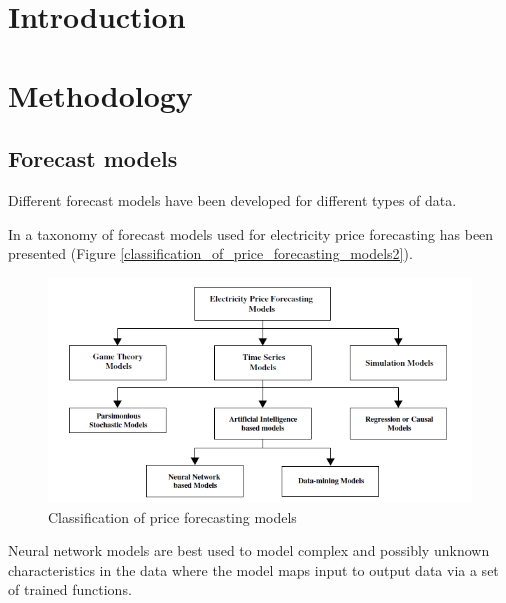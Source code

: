 
\section{Introduction}


\section{Methodology}


\subsection{Forecast models}

Different forecast models have been developed for different types of data. 

In \cite{aggarwal2009electricity} a taxonomy of forecast models used for electricity price forecasting has been presented (Figure \ref{classification_of_price_forecasting_models2}). 

\begin{figure}[htbp]
	\centering
		\includegraphics{figures/state_of_the_art/classification_of_price_forecasting_models.PNG}
	\caption{Classification of price forecasting models \cite{aggarwal2009electricity}}
	\label{fig:classification_of_price_forecasting_models2}
\end{figure}

Neural network models are best used to model complex and possibly unknown characteristics in the data where the model maps input to output data via a set of trained functions. 



